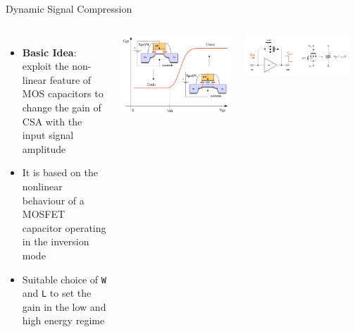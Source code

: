 \documentclass[aspectratio=169,xcolor=dvipsnames,handout]{beamer} %
\begin{document}
\begin{frame}{Dynamic Signal Compression}
    \fontsize{8.5pt}{1}\selectfont
    \addtolength{\leftmargini}{\labelsep}

    \begin{columns}
            \begin{itemize}
                \item \textbf{Basic Idea}: exploit the non-linear feature of MOS capacitors to change the gain of CSA with the input signal amplitude
                \item It is based on the nonlinear behaviour of a MOSFET capacitor operating in the inversion mode
                \item Suitable choice of \texttt{W} and \texttt{L} to set the gain in the low and high energy regime 
            \end{itemize}

            \centering
            \vspace{0.5cm}
            \includegraphics[height=0.5\textheight]{images/backup_slides/capacitance_value_plot.jpg}

            \centering
            \includegraphics[width=0.9\textwidth]{images/backup_slides/dynamic_compression.pdf}


\end{columns}
\end{frame}
\end{document}
